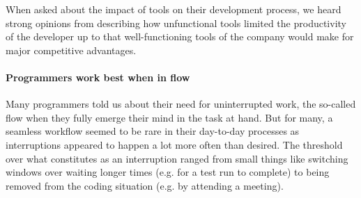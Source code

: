 When asked about the impact of tools on their development process, we heard strong opinions from describing how unfunctional tools limited the productivity of the developer up to that well-functioning tools of the company would make for major competitive advantages.

\paragraph{Programmers work best when in flow} Many programmers told us about their need for uninterrupted work, the so-called flow when they fully emerge their mind in the task at hand. But for many, a seamless workflow seemed to be rare in their day-to-day processes as interruptions appeared to happen a lot more often than desired. The threshold over what constitutes as an interruption ranged from small things like switching windows over waiting longer times (e.g. for a test run to complete) to being removed from the coding situation (e.g. by attending a meeting).